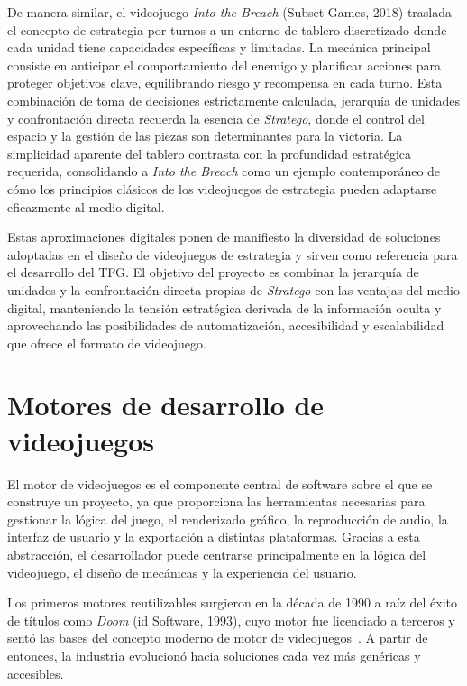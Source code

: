 De manera similar, el videojuego \textit{Into the Breach} (Subset Games, 2018) traslada el concepto de estrategia por turnos a un entorno de tablero discretizado donde cada unidad tiene capacidades específicas y limitadas. La mecánica principal consiste en anticipar el comportamiento del enemigo y planificar acciones para proteger objetivos clave, equilibrando riesgo y recompensa en cada turno. Esta combinación de toma de decisiones estrictamente calculada, jerarquía de unidades y confrontación directa recuerda la esencia de \textit{Stratego}, donde el control del espacio y la gestión de las piezas son determinantes para la victoria. La simplicidad aparente del tablero contrasta con la profundidad estratégica requerida, consolidando a \textit{Into the Breach} como un ejemplo contemporáneo de cómo los principios clásicos de los videojuegos de estrategia pueden adaptarse eficazmente al medio digital.

Estas aproximaciones digitales ponen de manifiesto la diversidad de soluciones adoptadas en el diseño de videojuegos de estrategia y sirven como referencia para el desarrollo del TFG. El objetivo del proyecto es combinar la jerarquía de unidades y la confrontación directa propias de \textit{Stratego} con las ventajas del medio digital, manteniendo la tensión estratégica derivada de la información oculta y aprovechando las posibilidades de automatización, accesibilidad y escalabilidad que ofrece el formato de videojuego.

\clearpage

\section{Motores de desarrollo de videojuegos}

El motor de videojuegos es el componente central de software sobre el que se construye un proyecto, ya que proporciona las herramientas necesarias para gestionar la lógica del juego, el renderizado gráfico, la reproducción de audio, la interfaz de usuario y la exportación a distintas plataformas. Gracias a esta abstracción, el desarrollador puede centrarse principalmente en la lógica del videojuego, el diseño de mecánicas y la experiencia del usuario.

Los primeros motores reutilizables surgieron en la década de 1990 a raíz del éxito de títulos como \textit{Doom} (id Software, 1993), cuyo motor fue licenciado a terceros y sentó las bases del concepto moderno de motor de videojuegos~\cite{Kushner2003}. A partir de entonces, la industria evolucionó hacia soluciones cada vez más genéricas y accesibles.

